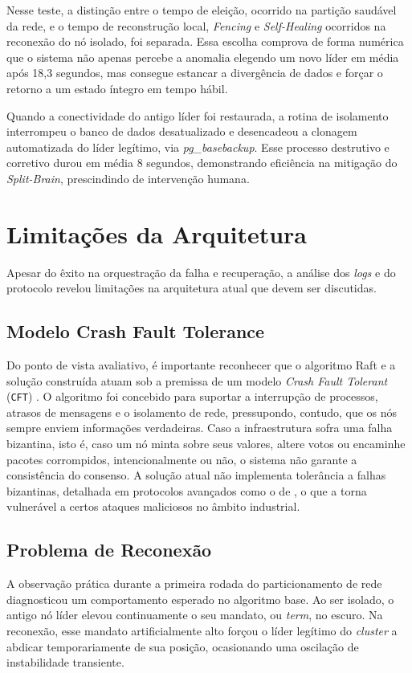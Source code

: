     Nesse teste, a distinção entre o tempo de eleição, ocorrido na partição saudável da rede, e o tempo de reconstrução local, \textit{Fencing} e \textit{Self-Healing} ocorridos na reconexão do nó isolado, foi separada. Essa escolha comprova de forma numérica que o sistema não apenas percebe a anomalia elegendo um novo líder em média após 18,3 segundos, mas consegue estancar a divergência de dados e forçar o retorno a um estado íntegro em tempo hábil.
    
    Quando a conectividade do antigo líder foi restaurada, a rotina de isolamento interrompeu o banco de dados desatualizado e desencadeou a clonagem automatizada do líder legítimo, via \textit{pg\_basebackup}. Esse processo destrutivo e corretivo durou em média 8 segundos, demonstrando eficiência na mitigação do \textit{Split-Brain}, prescindindo de intervenção humana.
    
\section{Limitações da Arquitetura}
\label{sec:limitacoes}

    Apesar do êxito na orquestração da falha e recuperação, a análise dos \textit{logs} e do protocolo revelou limitações na arquitetura atual que devem ser discutidas.

    \subsection{Modelo Crash Fault Tolerance}
        Do ponto de vista avaliativo, é importante reconhecer que o algoritmo Raft e a solução construída atuam sob a premissa de um modelo \textit{Crash Fault Tolerant} (\verb|CFT|) \cite{raft2014}. O algoritmo foi concebido para suportar a interrupção de processos, atrasos de mensagens e o isolamento de rede, pressupondo, contudo, que os nós sempre enviem informações verdadeiras. Caso a infraestrutura sofra uma falha bizantina, isto é, caso um nó minta sobre seus valores, altere votos ou encaminhe pacotes corrompidos, intencionalmente ou não, o sistema não garante a consistência do consenso. A solução atual não implementa tolerância a falhas bizantinas, detalhada em protocolos avançados como o de , o que a torna vulnerável a certos ataques maliciosos no âmbito industrial.

    \subsection{Problema de Reconexão}
        A observação prática durante a primeira rodada do particionamento de rede diagnosticou um comportamento esperado no algoritmo base. Ao ser isolado, o antigo nó líder elevou continuamente o seu mandato, ou \textit{term}, no escuro. Na reconexão, esse mandato artificialmente alto forçou o líder legítimo do \textit{cluster} a abdicar temporariamente de sua posição, ocasionando uma oscilação de instabilidade transiente. 
    
